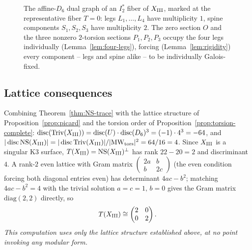 \documentclass[11pt]{amsart}
\theoremstyle{definition}
\newcommand{\Triv}{\mathrm{Triv}}
\newcommand{\NS}{\mathrm{NS}}
\DeclareMathOperator{\disc}{disc}
\begin{document}
\begin{center}
\begin{figure}[h]
\centering
{}
\caption{The affine-$D_6$ dual graph of an $I_2^*$ fiber of $X_{\rm
III}$, marked at the representative fiber $T=0$: legs $L_1,\dots,L_4$
have multiplicity $1$, spine components $S_1,S_2,S_3$ have multiplicity
$2$. The zero section $O$ and the three nonzero $2$-torsion sections
$P_1,P_2,P_3$ occupy the four legs individually (Lemma~\ref{lem:four-legs}),
forcing (Lemma~\ref{lem:rigidity}) every component -- legs and spine
alike -- to be individually Galois-fixed.}
\label{fig:D6}
\end{figure}
\end{center}

\subsection*{Lattice consequences}

Combining Theorem~\ref{thm:NS-trace} with the lattice structure of
Proposition~\ref{prop:picard} and the torsion order of
Proposition~\ref{prop:torsion-complete}: $\disc(\Triv(X_{\rm III})) =
\disc(U)\cdot\disc(D_6)^3 = (-1)\cdot4^3=-64$, and
$|\disc\NS(X_{\rm III})| = |\disc\Triv(X_{\rm III})|/|\mathrm{MW}_{\rm
tors}|^2 = 64/16=4$. Since $X_{\rm III}$ is a singular K3 surface,
$T(X_{\rm III})=\NS(X_{\rm III})^\perp$ has rank $22-20=2$ and
discriminant $4$. A rank-$2$ even lattice with Gram matrix
$\begin{pmatrix}2a&b\\b&2c\end{pmatrix}$ (the even condition forcing both
diagonal entries even) has determinant $4ac-b^2$; matching $4ac-b^2=4$
with the trivial solution $a=c=1,\,b=0$ gives the Gram matrix
$\mathrm{diag}(2,2)$ directly, so
\[
T(X_{\rm III}) \cong \begin{pmatrix}2&0\\0&2\end{pmatrix}.
\]
\emph{This computation uses only the lattice structure established
above, at no point invoking any modular form.}
\end{document}
